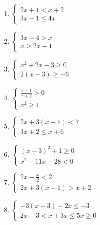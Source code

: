 \begin{enumerate}[topsep=0pt]
	\item $ \begin{cases}
		2x+1 < x+2 \\
		3x-1  \le 4x
	\end{cases}  $
	\item $ \begin{cases}
		3x - 4 > x \\
		x \ge 2x -1
	\end{cases}  $
	\item $ \begin{cases}
		x^2 +2x -3 \ge 0 \\
		2(x-3) \ge -6
	\end{cases}  $
	\item $ \begin{cases}
		\frac{x-1}{x+2} >	 0 \\
		x^2 \ge 1
	\end{cases}  $

	\item $ \begin{cases}
	2x+3(x-1) < 7 \\
	3x+2 \le x+6
	\end{cases}  $

	\item $ \begin{cases}
	(x-3)^2 +1 \ge 0 \\
	x^2 -11x + 28 < 0
	\end{cases}  $

	\item $ \begin{cases}
	2x - \frac{x}{2} < 2 \\
	2x + 3(x-1) > x+2
	\end{cases}  $
	
	\item $ \begin{cases}
		-3(x-3) - 2x \le -3 \\
		2x-3 < x+3
		x \le 5
		x \ge 0
	\end{cases}  $
\end{enumerate}







